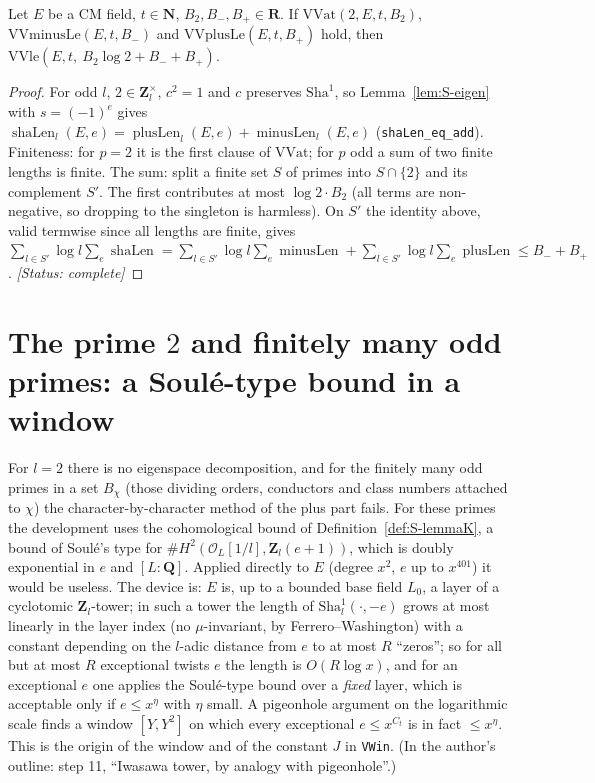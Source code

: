 \begin{proposition}\label{prop:S-parts}
Let $E$ be a CM field, $t\in\mathbf{N}$, $B_2,B_-,B_+\in\mathbf{R}$. If $\mathrm{VVat}(2,E,t,B_2)$,
$\mathrm{VVminusLe}(E,t,B_-)$ and $\mathrm{VVplusLe}(E,t,B_+)$ hold, then
$\mathrm{VVle}(E,t,\ B_2\log 2+B_-+B_+)$.
\end{proposition}
\begin{proof}
For odd $l$, $2\in\mathbf{Z}_l^\times$, $c^2=1$ and $c$ preserves $\mathrm{Sha}^1$, so Lemma~\ref{lem:S-eigen} with
$s=(-1)^e$ gives $\operatorname{shaLen}_l(E,e)=\operatorname{plusLen}_l(E,e)+\operatorname{minusLen}_l(E,e)$ (\texttt{shaLen\_eq\_add}).
Finiteness: for $p=2$ it is the first clause of $\mathrm{VVat}$; for $p$ odd a sum of two finite lengths is finite.
The sum: split a finite set $S$ of primes into $S\cap\{2\}$ and its complement $S'$. The first contributes
at most $\log2\cdot B_2$ (all terms are non-negative, so dropping to the singleton is harmless). On $S'$ the
identity above, valid termwise since all lengths are finite, gives
$\sum_{l\in S'}\log l\sum_e\operatorname{shaLen}=\sum_{l\in S'}\log l\sum_e\operatorname{minusLen}+\sum_{l\in S'}\log l\sum_e\operatorname{plusLen}\le B_-+B_+$.
\textit{[Status: complete]}
\end{proof}

\section{The prime $2$ and finitely many odd primes: a Soul\'e-type bound in a window}\label{sec:S-bab}

For $l=2$ there is no eigenspace decomposition, and for the finitely many odd primes in a set
$B_\chi$ (those dividing orders, conductors and class numbers attached to $\chi$) the character-by-character
method of the plus part fails. For these primes the development uses the cohomological bound of Definition~\ref{def:S-lemmaK}, a bound of Soul\'e's type for $\#H^2(\mathcal{O}_L[1/l],\mathbf{Z}_l(e+1))$, which is doubly exponential in $e$ and
$[L:\mathbf{Q}]$. Applied directly to $E$ (degree $x^{2}$, $e$ up to $x^{401}$) it would be useless. The device is:
$E$ is, up to a bounded base field $L_0$, a layer of a cyclotomic $\mathbf{Z}_l$-tower; in such a tower the
length of $\mathrm{Sha}^1_l(\cdot,-e)$ grows at most linearly in the layer index (no $\mu$-invariant, by
Ferrero--Washington) with a constant depending on the $l$-adic distance from $e$ to at most $R$ ``zeros'';
so for all but at most $R$ exceptional twists $e$ the length is $O(R\log x)$, and for an exceptional $e$
one applies the Soul\'e-type bound over a \emph{fixed} layer, which is acceptable only if $e\le x^{\eta}$
with $\eta$ small. A pigeonhole argument on the logarithmic scale finds a window $[Y,Y^2]$ on which every
exceptional $e\le x^{C_t}$ is in fact $\le x^{\eta}$. This is the origin of the window and of the constant
$J$ in \texttt{VWin}. (In the author's outline: step 11, ``Iwasawa tower, by analogy with pigeonhole''.)

